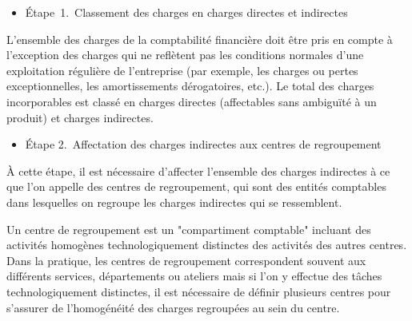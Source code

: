 \documentclass[oneside]{kaobook}
\begin{document}
\begin{itemize}
\item Étape 1. Classement des charges en charges directes et indirectes
\end{itemize}
L'ensemble des charges de la comptabilité financière doit être pris en compte à l'exception des charges qui ne reflètent pas les conditions normales d'une exploitation régulière de l'entreprise (par exemple, les charges ou pertes exceptionnelles, les amortissements dérogatoires, etc.). Le total des charges incorporables est classé en charges directes (affectables sans ambiguïté à un produit) et charges indirectes.

\begin{itemize}
\item Étape 2. Affectation des charges indirectes aux centres de regroupement
\end{itemize}
À cette étape, il est nécessaire d'affecter l'ensemble des charges indirectes à ce que l'on appelle des centres de regroupement, qui sont des entités comptables dans lesquelles on regroupe les charges indirectes qui se ressemblent.

Un centre de regroupement est un "compartiment comptable" incluant des activités homogènes technologiquement distinctes des activités des autres centres. Dans la pratique, les centres de regroupement correspondent souvent aux différents services, départements ou ateliers mais si l'on y effectue des tâches technologiquement distinctes, il est nécessaire de définir plusieurs centres pour s'assurer de l'homogénéité des charges regroupées au sein du centre.
\end{document}
